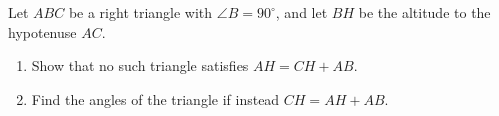 Let $ABC$ be a right triangle with $\angle B=90^\circ$, and let $BH$ be the altitude to the hypotenuse $AC$.
\begin{enumerate}
\item[(a)] Show that no such triangle satisfies $AH=CH+AB$.
\item[(b)] Find the angles of the triangle if instead $CH=AH+AB$.
\end{enumerate}
